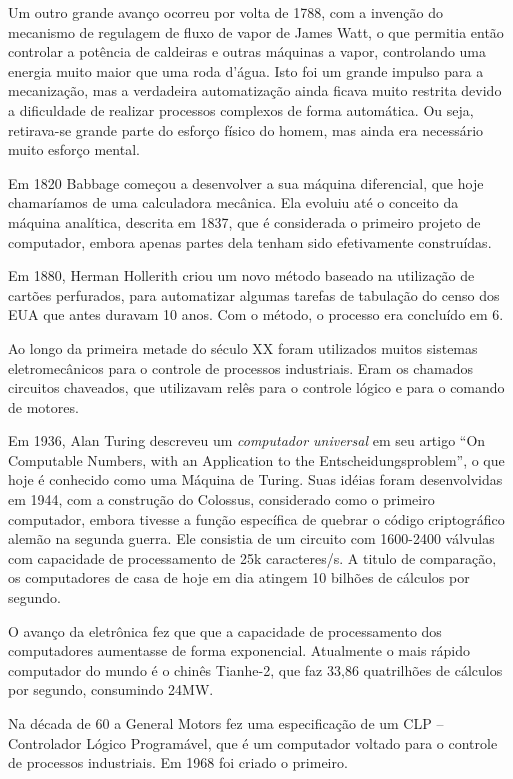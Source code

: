 Um outro grande avanço ocorreu por volta de 1788, com a invenção do mecanismo de regulagem de fluxo de vapor de James Watt, o que permitia então controlar a potência de caldeiras e outras máquinas a vapor, controlando uma energia muito maior que uma roda d'água. Isto foi um grande impulso para a mecanização, mas a verdadeira automatização ainda ficava muito restrita devido a dificuldade de realizar processos complexos de forma automática. Ou seja, retirava-se grande parte do esforço físico do homem, mas ainda era necessário muito esforço mental.

Em 1820 Babbage começou a desenvolver a sua máquina diferencial, que hoje chamaríamos de uma calculadora mecânica. Ela evoluiu até o conceito da máquina analítica, descrita em 1837, que é considerada o primeiro projeto de computador, embora apenas partes dela tenham sido efetivamente construídas.

 Em 1880, Herman Hollerith criou um novo método baseado na
utilização de cartões perfurados, para automatizar algumas tarefas de
tabulação do censo dos EUA que antes duravam 10 anos. Com o
método, o processo era concluído em 6.

Ao longo da primeira metade do século XX foram utilizados muitos sistemas eletromecânicos para o controle de processos industriais. Eram os chamados circuitos chaveados, que utilizavam relês para o controle lógico e para o comando de motores.

Em 1936, Alan Turing descreveu um \emph{computador universal} em seu artigo “On Computable Numbers, with an Application to the Entscheidungsproblem”, o que hoje é conhecido como uma Máquina de Turing. Suas idéias foram desenvolvidas em 1944, com a construção do Colossus, considerado como o primeiro computador, embora tivesse a função específica de quebrar o código criptográfico alemão na segunda guerra. Ele consistia de um circuito com 1600-2400 válvulas com capacidade de processamento de 25k caracteres/s. A titulo de comparação, os computadores de casa de hoje em dia atingem 10 bilhões de cálculos por
segundo.

O avanço da eletrônica fez que que a capacidade de processamento dos computadores aumentasse de forma exponencial. Atualmente o mais rápido computador do mundo é o chinês Tianhe-2, que faz 33,86 quatrilhões de cálculos por segundo, consumindo 24MW.

Na década de 60 a General Motors fez uma especificação de um CLP -- Controlador Lógico Programável, que é um computador voltado para o controle de processos industriais. Em 1968 foi criado o primeiro.

